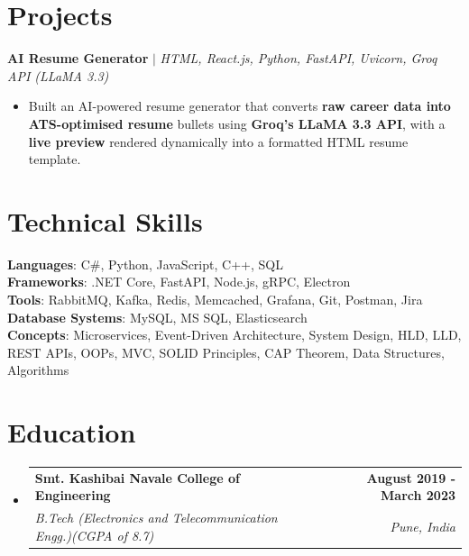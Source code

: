 \documentclass[letterpaper,11pt]{article}
\makeatletter
\newcommand{\resumeItem}[1]{
  \item\small{
	{#1 \vspace{-2pt}}
  }
}
\newcommand{\resumeSubheading}[4]{
  \vspace{-2pt}\item
	\begin{tabular*}{1.0\textwidth}[t]{l@{\extracolsep{\fill}}r}
  	\textbf{#1} & \textbf{\small #2} \\
  	\textit{\small#3} & \textit{\small #4} \\
	\end{tabular*}\vspace{-7pt}
}
\newcommand{\resumeSubHeadingListStart}{\begin{itemize}[leftmargin=0.0in, label={}]}
\newcommand{\resumeSubHeadingListEnd}{\end{itemize}}
\newcommand{\resumeItemListStart}{\begin{itemize}}
\newcommand{\resumeItemListEnd}{\end{itemize}\vspace{-5pt}}
\makeatother
\begin{document}
\section{Projects}
  \resumeProjectHeadingccc
      {\large\textbf{AI Resume Generator} $|$  \emph{HTML, React.js, Python, FastAPI, Uvicorn, Groq API (LLaMA 3.3)}}
    \begin{itemize}[leftmargin=0.0in,label={}]
      	\resumeItemListStart
	      \vspace{-7pt}
        	\resumeItem{Built an AI-powered resume generator that converts \textbf{raw career data into ATS-optimised resume} bullets using \textbf{Groq's LLaMA 3.3 API}, with a \textbf{live preview} rendered dynamically into a formatted HTML resume template.}
            
      	\resumeItemListEnd
    \end{itemize}


\vspace{-20pt}
\section{Technical Skills}
\begin{itemize}[leftmargin=0.15in, label={}]
    \small{\item{
        \textbf{Languages}{: C\#, Python, JavaScript, C++, SQL} \\
        \textbf{Frameworks}{: .NET Core, FastAPI, Node.js, gRPC, Electron} \\
        \textbf{Tools}{: RabbitMQ, Kafka, Redis, Memcached, Grafana, Git, Postman, Jira} \\
        \textbf{Database Systems}{: MySQL, MS SQL, Elasticsearch} \\
        \textbf{Concepts}{: Microservices, Event-Driven Architecture, System Design, HLD, LLD, REST APIs, OOPs, MVC, SOLID Principles, CAP Theorem, Data Structures, Algorithms} \\
    }}
\end{itemize}

\vspace{-18pt}
\section{Education}
  \resumeSubHeadingListStart
	\resumeSubheading
  	{Smt. Kashibai Navale College of Engineering}{August 2019 - March 2023}
  	{{B.Tech} (Electronics and Telecommunication Engg.)(CGPA of 8.7)}{Pune, India}
  \resumeSubHeadingListEnd
  
\end{document}
